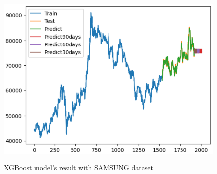 \documentclass[conference]{IEEEtran}
\begin{document}
\begin{figure}[H]
\begin{minipage}{0.15\textwidth}
    \label{fig:2}
    \end{minipage}%
    \begin{minipage}{0.15\textwidth}
    \centering
    \includegraphics[width=1\textwidth]{Image/XGBoost/XGBoost_SAMSUNG_8_2.png}

    \label{fig:3}
    \end{minipage}
    \caption{ XGBoost model's result with SAMSUNG dataset }
\end{figure}
\end{document}
